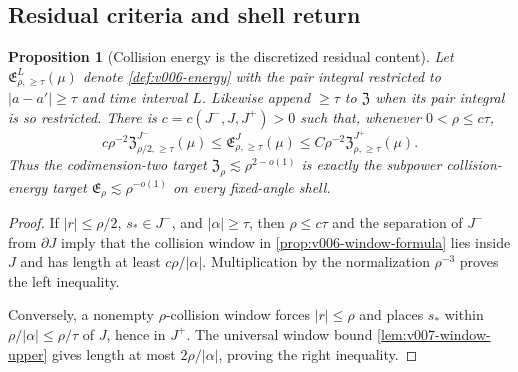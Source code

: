 \documentclass[10pt]{article}
\newtheorem{proposition}[theorem]{Proposition}
\begin{document}
\subsection{Residual criteria and shell return}

\begin{proposition}[Collision energy is the discretized residual content]
\label{prop:v048-energy-residual-equivalence}
Let \(\mathfrak E_{\rho,\ge\tau}^{L}(\mu)\) denote
\cref{def:v006-energy} with the pair integral restricted to \(|a-a'|\ge\tau\) and time interval
\(L\).  Likewise append \(\ge\tau\) to \(\mathfrak Z\) when its pair integral is so restricted.
There is \(c=c(J^-,J,J^+)>0\) such that, whenever \(0<\rho\le c\tau\),
\begin{equation}
\label{eq:v048-energy-residual-equivalence}
\boxed{
c\rho^{-2}
\mathfrak Z_{\rho/2,\ge\tau}^{J^-}(\mu)
\le
\mathfrak E_{\rho,\ge\tau}^{J}(\mu)
\le
C\rho^{-2}
\mathfrak Z_{\rho,\ge\tau}^{J^+}(\mu).
}
\end{equation}
Thus the codimension-two target
\(\mathfrak Z_\rho\lesssim\rho^{2-o(1)}\) is exactly the subpower collision-energy target
\(\mathfrak E_\rho\lesssim\rho^{-o(1)}\) on every fixed-angle shell.
\end{proposition}

\begin{proof}
If \(|r|\le\rho/2\), \(s_*\in J^-\), and \(|\alpha|\ge\tau\), then
\(\rho\le c\tau\) and the separation of \(J^-\) from \(\partial J\) imply that the collision
window in \cref{prop:v006-window-formula} lies inside \(J\) and has length at least
\(c\rho/|\alpha|\).  Multiplication by the normalization \(\rho^{-3}\) proves the left inequality.

Conversely, a nonempty \(\rho\)-collision window forces \(|r|\le\rho\) and places \(s_*\) within
\(\rho/|\alpha|\le\rho/\tau\) of \(J\), hence in \(J^+\).  The universal window bound
\cref{lem:v007-window-upper} gives length at most \(2\rho/|\alpha|\), proving the right inequality.
\end{proof}
\end{document}
